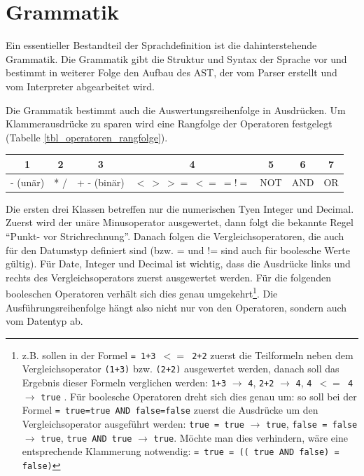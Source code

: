   	





\section{Grammatik}
\label{design_grammatik}

Ein essentieller Bestandteil der Sprachdefinition ist die dahinterstehende Grammatik. Die Grammatik gibt die Struktur und Syntax der Sprache vor und bestimmt in weiterer Folge den Aufbau des AST, der vom Parser erstellt und vom Interpreter abgearbeitet wird.

Die Grammatik bestimmt auch die Auswertungsreihenfolge in Ausdrücken. Um Klammerausdrücke zu sparen wird eine Rangfolge der Operatoren festgelegt (Tabelle \ref{tbl_operatoren_rangfolge}).

\begin{center}
\label{tbl_operatoren_rangfolge}
\begin{tabular}[ht]{|c | c | c | c | c | c | c |}
\hline
1 & 2 & 3 & 4 & 5 & 6 & 7 \\
\hline
- (unär) & * / & + - (binär) & $< \ > \ >= \ <= \ =  !=$ & NOT & AND & OR\\
\hline
\end{tabular}
\end{center}

Die ersten drei Klassen betreffen nur die numerischen Tyen Integer und Decimal. Zuerst wird der unäre Minusoperator ausgewertet, dann folgt die bekannte Regel ``Punkt- vor Strichrechnung''. Danach folgen die Vergleichsoperatoren, die auch für den Datumstyp definiert sind (bzw. = und != sind auch für boolesche Werte gültig). Für Date, Integer und Decimal ist wichtig, dass die Ausdrücke links und rechts des Vergleichsoperators zuerst ausgewertet werden. Für die folgenden booleschen Operatoren verhält sich dies genau umgekehrt\footnote{z.B. sollen in der Formel \texttt{= 1+3 $<=$ 2+2} zuerst die Teilformeln neben dem Vergleichsoperator \texttt{(1+3)} bzw. \texttt{(2+2)} ausgewertet werden, danach soll das Ergebnis dieser Formeln verglichen werden: \texttt{1+3} $\rightarrow$ \texttt{4}, \texttt{2+2} $\rightarrow$ \texttt{4}, \texttt{4 $<=$ 4} $\rightarrow$ \texttt{true} . Für boolesche Operatoren dreht sich dies genau um: so soll bei der Formel \texttt{= true=true AND false=false} zuerst die Ausdrücke um den Vergleichsoperator ausgeführt werden: \texttt{true = true} $\rightarrow$ \texttt{true}, \texttt{false = false} $\rightarrow$ \texttt{true}, \texttt{true AND true} $\rightarrow$ \texttt{true}. Möchte man dies verhindern, wäre eine ent\-sprech\-ende Klammerung not\-wen\-dig: \texttt{= true = (( true AND false) = false)}}. Die Aus\-führ\-ungsreihenfolge hängt also nicht nur von den Operatoren, sondern auch vom Datentyp ab.

